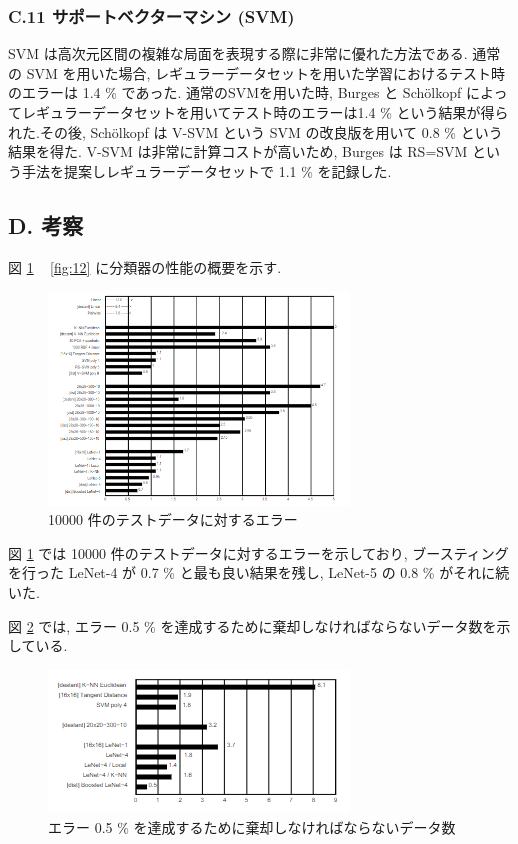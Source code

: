 \documentclass[twocolumn]{jarticle}     %
\begin{document}
\subsubsection*{C.11 サポートベクターマシン (SVM)}
SVM は高次元区間の複雑な局面を表現する際に非常に優れた方法である. 通常の SVM を用いた場合, レギュラーデータセットを用いた学習におけるテスト時のエラーは 1.4 \% であった.
通常のSVMを用いた時, Burges と Sch\"{o}lkopf によってレギュラーデータセットを用いてテスト時のエラーは1.4 \% という結果が得られた.その後, Sch\"{o}lkopf は V-SVM という SVM の改良版を用いて 0.8 \% という結果を得た. V-SVM は非常に計算コストが高いため, Burges は RS=SVM という手法を提案しレギュラーデータセットで 1.1 \% を記録した.

\subsection*{D. 考察}
図 \ref{fig:9} ~ \ref{fig:12} に分類器の性能の概要を示す. 
\begin{figure}[t]
  \centering
  \includegraphics[width=80mm]{assets/9.png}
  \caption{10000 件のテストデータに対するエラー}
  \label{fig:9}
\end{figure}
図 \ref{fig:9} では 10000 件のテストデータに対するエラーを示しており, ブースティングを行った LeNet-4 が 0.7 \% と最も良い結果を残し, LeNet-5 の 0.8 \% がそれに続いた.
\par
図 \ref{fig:10} では, エラー 0.5 \% を達成するために棄却しなければならないデータ数を示している. 
\begin{figure}[t]
  \centering
  \includegraphics[width=80mm]{assets/10.png}
  \caption{エラー 0.5 \% を達成するために棄却しなければならないデータ数}
  \label{fig:10}
\end{figure}
\end{document}
